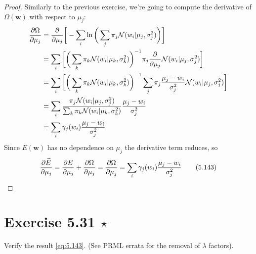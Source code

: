 \begin{proof}
    Similarly to the previous exercise, we're going to compute the derivative
    of $\Omega(\mathbf{w})$ with respect to $\mu_j$:
    \begin{align*}
        \pdv{\Omega}{\mu_j} 
        &= \pdv{\mu_j} \bigg[-\sum_{i}^{} \ln\bigg(\sum_{j}^{} \pi_j \mathcal{N}(w_i | \mu_j, \sigma_j^2)\bigg)\bigg] \\
        &= \sum_{i}^{} \bigg[\bigg(\sum_{k}^{} \pi_k \mathcal{N}(w_i | \mu_k, \sigma_k^2)\bigg)^{-1}
            \pi_j \pdv{\mu_j} \mathcal{N}(w_i | \mu_j, \sigma_j^2)\bigg] \\
        &= \sum_{i}^{} \bigg[\bigg(\sum_{k}^{} \pi_k \mathcal{N}(w_i | \mu_k, \sigma_k^2)\bigg)^{-1}
            \sum_{j}^{} \pi_j \frac{\mu_j - w_i}{\sigma_j^2} \mathcal{N}(w_i | \mu_j, \sigma_j^2)\bigg] \\
        &= \sum_{i}^{} \frac{\pi_j \mathcal{N}(w_i | \mu_j, \sigma_j^2)} 
            {\sum_{k}^{} \pi_k \mathcal{N}(w_i | \mu_k, \sigma_k^2)} \frac{\mu_j - w_i}{\sigma_j^2} \\
        &= \sum_{i}^{} \gamma_j(w_i) \frac{\mu_j - w_i}{\sigma_j^2}
    \end{align*}
    Since $E(\mathbf{w})$ has no dependence on $\mu_j$ the derivative term reduces, so
    \begin{equation*}
        \pdv{\widetilde{E}}{\mu_j} = \pdv{E}{\mu_j} + \pdv{\Omega}{\mu_j}
        = \pdv{\Omega}{\mu_j}
        = \sum_{i}^{} \gamma_j(w_i) \frac{\mu_j - w_i}{\sigma_j^2}
        \label{eq:5.142}\tag{5.143}
    \end{equation*}
\end{proof}

\section*{Exercise 5.31 $\star$}
Verify the result \eqref{eq:5.143}. (See PRML errata for the removal of $\lambda$ factors).

